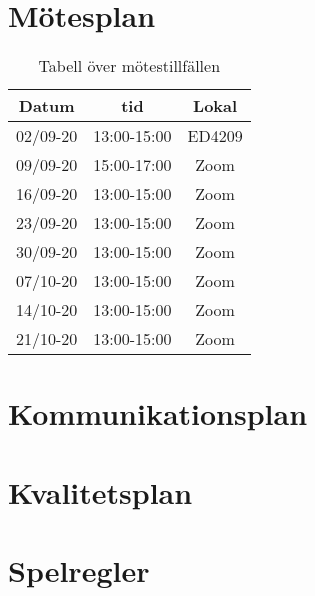 \documentclass{article}
\begin{document}
\section{Mötesplan}
\begin{table}[!h]
    \begin{center}
    \begin{tabular}{ |c|c|c| }
    \hline
    Datum & tid & Lokal \\
    \hline\hline
    02/09-20 & 13:00-15:00 & ED4209 \\\hline
    09/09-20 & 15:00-17:00 & Zoom \\\hline
    16/09-20 & 13:00-15:00 & Zoom \\\hline
    23/09-20 & 13:00-15:00 & Zoom \\\hline
    30/09-20 & 13:00-15:00 & Zoom \\\hline
    07/10-20 & 13:00-15:00 & Zoom \\\hline
    14/10-20 & 13:00-15:00 & Zoom \\\hline
    21/10-20 & 13:00-15:00 & Zoom \\\hline
    \end{tabular}
    \caption{Tabell över mötestillfällen}
    \label{motesplan}
    \end{center}
\end{table}

\section{Kommunikationsplan}

\section{Kvalitetsplan}

\section{Spelregler}



\end{document}
